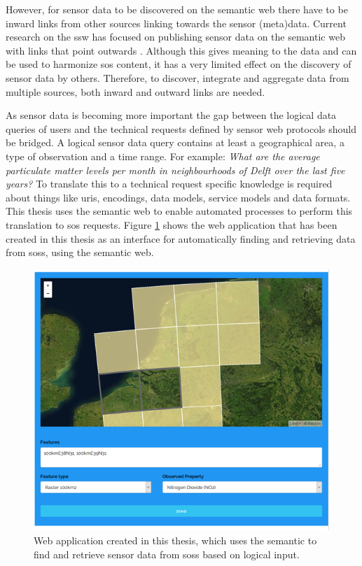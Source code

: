 However, for sensor data to be discovered on the semantic web there have to be inward links from other sources linking towards the sensor (meta)data. Current research on the \ac{ssw} has focused on publishing sensor data on the semantic web with links that point outwards \citep{SSW:Atkinson, SSW:Janowicz, SSW:Pschorr}. Although this gives meaning to the data and can be used to harmonize \ac{sos} content, it has a very limited effect on the discovery of sensor data by others. Therefore, to discover, integrate and aggregate data from multiple sources, both inward and outward links are needed.  

As sensor data is becoming more important the gap between the logical data queries of users and the technical requests defined by sensor web protocols should be bridged. A logical sensor data query contains at least a geographical area, a type of observation and a time range. For example: \textit{What are the average particulate matter levels per month in neighbourhoods of Delft over the last five years?} To translate this to a technical request specific knowledge is required about things like \acp{uri}, encodings, data models, service models and data formats. This thesis uses the semantic web to enable automated processes to perform this translation to \ac{sos} requests. Figure \ref{fig:logical} shows the web application that has been created in this thesis as an interface for automatically finding and retrieving data from \aclp{sos}, using the semantic web. 


\begin{figure}
	\centering
	\includegraphics[width=0.8\linewidth]{figs/interface1.PNG}
	\caption{Web application created in this thesis, which uses the semantic to find and retrieve sensor data from \aclp*{sos} based on logical input.}
	\label{fig:logical}
\end{figure}


